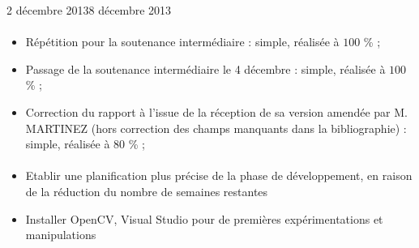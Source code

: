 \documentclass[11pt, french,screen]{report-rd-info}
\begin{document}
\begin{fichesuivi}{2 décembre 2013}{8 décembre 2013}
\paragraph{}
	\begin{travaileffectue}
		\begin{itemize}
			\item Répétition pour la soutenance intermédiaire : simple, réalisée à $100$ \% ;
			\item Passage de la soutenance intermédiaire le 4 décembre : simple, réalisée à $100$ \% ;
			\item Correction du rapport à l'issue de la réception de sa version amendée par M. MARTINEZ (hors correction des champs manquants dans la bibliographie) :  simple, réalisée à $80$ \% ;
		\end{itemize}
	\end{travaileffectue}

\paragraph*{}
	\begin{planification}
		\begin{itemize}
			\item Etablir une planification plus précise de la phase de développement, en raison de la réduction du nombre de semaines restantes
			\item Installer OpenCV, Visual Studio pour de premières expérimentations et manipulations
		\end{itemize}
	\end{planification}
\end{fichesuivi}
\end{document}
